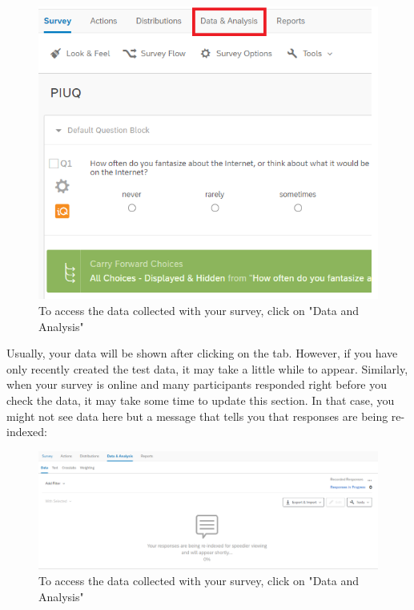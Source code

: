 \documentclass[
]{book}
\begin{document}
\begin{figure}

{\centering \includegraphics[width=0.85\linewidth]{images/Qualtrics/12checkdata1} 

}

\caption{To access the data collected with your survey, click on "Data and Analysis"}\label{fig:Figure11-11}
\end{figure}

Usually, your data will be shown after clicking on the tab. However, if you have only recently created the test data, it may take a little while to appear. Similarly, when your survey is online and many participants responded right before you check the data, it may take some time to update this section. In that case, you might not see data here but a message that tells you that responses are being re-indexed:

\begin{figure}

{\centering \includegraphics[width=0.85\linewidth]{images/Qualtrics/13checkdata2} 

}

\caption{To access the data collected with your survey, click on "Data and Analysis"}\label{fig:Figure11-12}
\end{figure}
\end{document}
